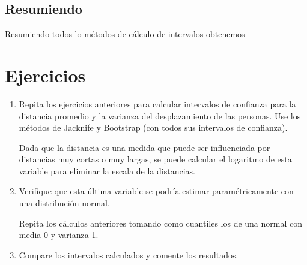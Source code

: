 \documentclass[12pt]{book}\usepackage[]{graphicx}\usepackage[]{color}
\theoremstyle{definition}
\theoremstyle{plain}
\begin{document}
\subsection{Resumiendo}


Resumiendo todos lo métodos de cálculo de intervalos obtenemos



\section{Ejercicios}

\begin{enumerate}
    \item Repita los ejercicios anteriores para calcular intervalos de confianza para la distancia promedio y la varianza del desplazamiento de las personas. Use los métodos de Jacknife y Bootstrap (con todos sus intervalos de confianza).

    Dada que la distancia es una medida que puede ser influenciada por distancias muy cortas o muy largas, se puede calcular el logaritmo de esta variable para eliminar la escala de la distancias.

    \item Verifique que esta última variable se podría estimar paramétricamente con una distribución normal.

    Repita los cálculos anteriores tomando como cuantiles los de una normal con media 0 y varianza 1.

    \item Compare los intervalos calculados y comente los resultados.

\end{enumerate}



\newpage
\printbibliography
\end{document}

